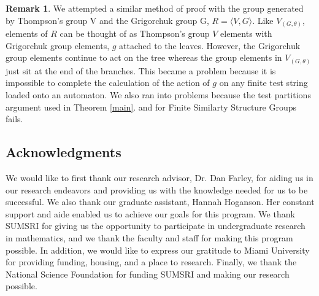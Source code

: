 \documentclass[11pt]{amsart}
\theoremstyle{plain}
\theoremstyle{remark}
\theoremstyle{definition}
\newtheorem{remark}[theorem]{Remark}
\theoremstyle{remark}
\theoremstyle{named}
\begin{document}
\begin{remark}
We attempted a similar method of proof with the group generated by Thompson's group V and the Grigorchuk group G, $R=\langle V,G \rangle$. Like $V_{(G,\theta)}$, elements of $R$ can be thought of as Thompson's group $V$ elements with Grigorchuk group elements, $g$ attached to the leaves. However, the Grigorchuk group elements continue to act on the tree whereas the group elements in $V_{(G,\theta)}$ just sit at the end of the branches. This became a problem because it is impossible to complete the calculation of the action of $g$ on any finite test string loaded onto an automaton. We also ran into problems because the test partitions argument used in Theorem \ref{main}. and for Finite Similarty Structure Groups \cite{Hughes1} fails.
\end{remark}

\subsection*{Acknowledgments}
We would like to first thank our research advisor, Dr. Dan Farley, for aiding us in our research endeavors and providing us with the knowledge needed for us to be successful. We also thank our graduate assistant, Hannah Hoganson. Her constant support and aide enabled us to achieve our goals for this program. We thank SUMSRI for giving us the opportunity to participate in undergraduate research in mathematics, and we thank the faculty and staff for making this program possible. In addition, we would like to express our gratitude to Miami University for providing funding, housing, and a place to research. Finally, we thank the National Science Foundation for funding SUMSRI and making our research possible. 


\nocite{FarleyHughes}
\end{document}
